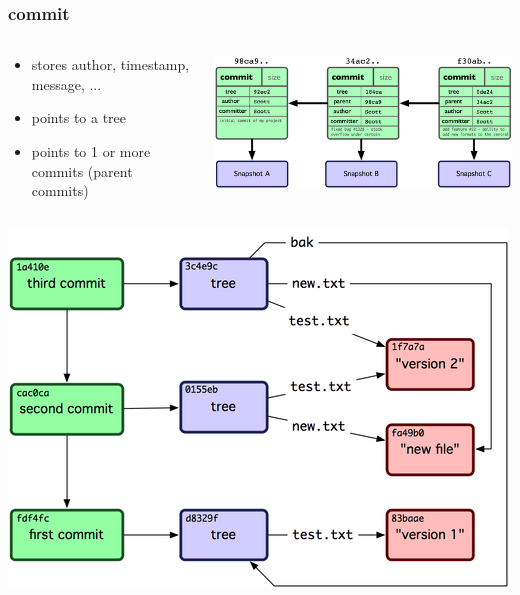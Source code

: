 \begin{frame}[fragile]
	\frametitle{commit}

	\begin{columns}
	\begin{column}{0.5\textwidth}
		\begin{itemize}
		\item stores author, timestamp, message, ...
		\item points to a tree
		\item points to 1 or more commits (parent commits)
		\end{itemize}
	\end{column}
	\begin{column}{0.5\textwidth}
		\includegraphics[width=\textwidth]{images/commits.png}
	\end{column}
	\end{columns}

\end{frame}

\begin{frame}
	\includegraphics[width=\textwidth]{images/git-objects.png}
\end{frame}
